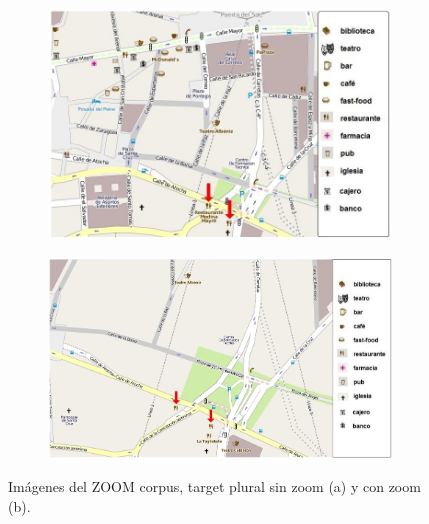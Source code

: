 \begin{figure}[h]
\begin{subfigure}{.47\textwidth}
\centering
\includegraphics[width=\textwidth]{images/corpus/mapa10.png}\\[0pt]
\caption{}
\label{pluralx}
\end{subfigure}
\begin{subfigure}{.53\textwidth}
\centering
\includegraphics[width=\textwidth]{images/corpus/mapa20.png}\\[0pt]
\caption{}
\label{plural2x}
\end{subfigure}
\caption{Im\'agenes del ZOOM corpus, target plural sin zoom (a) y con zoom (b).}\label{imagenes-zoom-corpus}
\end{figure}

